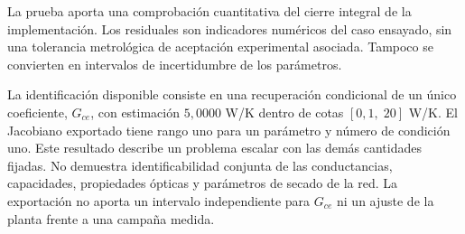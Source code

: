 La prueba aporta una comprobación cuantitativa del cierre integral de la implementación. Los residuales son indicadores numéricos del caso ensayado, sin una tolerancia metrológica de aceptación experimental asociada. Tampoco se convierten en intervalos de incertidumbre de los parámetros.

La identificación disponible consiste en una recuperación condicional de un único coeficiente, $G_{ce}$, con estimación $5{,}0000$ W/K dentro de cotas $[0{,}1,\;20]$ W/K. El Jacobiano exportado tiene rango uno para un parámetro y número de condición uno. Este resultado describe un problema escalar con las demás cantidades fijadas. No demuestra identificabilidad conjunta de las conductancias, capacidades, propiedades ópticas y parámetros de secado de la red. La exportación no aporta un intervalo independiente para $G_{ce}$ ni un ajuste de la planta frente a una campaña medida.

\FloatBarrier

\label{res:validacion_fisica}




